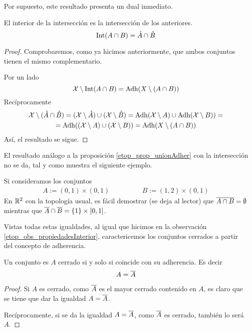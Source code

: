 Por supuesto, este resultado presenta un dual inmediato.
\begin{cor}
	El interior de la intersección es la intersección de los anteriores.
	\begin{equation*}
	\operatorname{\mathrm{Int}}(A\cap B)=\mathring{A}\cap\mathring{B}
	\end{equation*}
\end{cor}
\begin{proof}
	Comprobaremos, como ya hicimos anteriormente, que ambos conjuntos tienen el mismo complementario.
	
	Por un lado
	\begin{equation*}
	\mathcal{X} \setminus \operatorname{\mathrm{Int}}(A\cap B)=\operatorname{\mathrm{Adh}}(X\setminus (A\cap B))
	\end{equation*}
	Recíprocamente
	\begin{multline*}
	\mathcal{X} \setminus (\mathring{A}\cap \mathring{B})=(\mathcal{X} \setminus \mathring{A})\cup(\mathcal{X} \setminus \mathring{B})=\operatorname{\mathrm{Adh}}(\mathcal{X} \setminus A)\cup \operatorname{\mathrm{Adh}}(\mathcal{X} \setminus B))=\\=\operatorname{\mathrm{Adh}}((\mathcal{X} \setminus A) \cup (\mathcal{X} \setminus B))=\operatorname{\mathrm{Adh}}(X\setminus (A\cap B))
	\end{multline*}
	Así, el resultado se sigue.
\end{proof}
El resultado análogo a la proposición \ref{etop_prop_unionAdher} con la intersección no se da, tal y como muestra el siguiente ejemplo.
\begin{exa}
	\label{etop_ejem_cuadradosAbiertos}
	Si consideramos los conjuntos
	\begin{equation*}
	\begin{array}{cc}
	A:=(0,1)\times(0,1)\qquad&\qquad B:=(1,2)\times(0,1)
	\end{array}
	\end{equation*}
	En $\mathbb{R}^2$ con la topología usual, es fácil demostrar (se deja al lector) que $\overline{A\cap B}=\emptyset$ mientras que $\overline{A}\cap\overline{B}=\{1\}\times[0,1]$.
\end{exa}
Vistas todas estas igualdades, al igual que hicimos en la observación \ref{etop_obs_propiedadesInterior}, caractericemos los conjuntos cerrados a partir del concepto de adherencia.
\begin{prop}
	\label{etop_prop_cerradosAdher}
	Un conjunto es $A$ cerrado si y solo si coincide con su adherencia. Es decir
	\begin{equation*}
	A=\overline{A}
	\end{equation*}
\end{prop}
\begin{proof}
	Si $A$ es cerrado, como $\overline{A}$ es el mayor cerrado contenido en $A$, es claro que se tiene que dar la igualdad $A=\overline{A}$.
	
	Recíprocamente, si se da la igualdad $A=\overline{A}$, como $\overline{A}$ es cerrado, también lo será $A$.
\end{proof}
